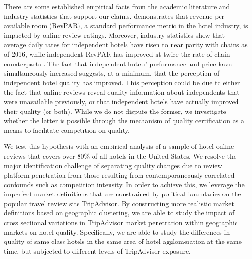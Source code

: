 \documentclass[mksc,blindrev]{informs3} %
\begin{document}
There are some established empirical facts from the academic literature and industry statistics that support our claims.  demonstrates that revenue per available room (RevPAR), a standard performance metric in the hotel industry, is impacted by online review ratings. Moreover, industry statistics show that average daily rates for independent hotels have risen to near parity with chains as of 2016, while independent RevPAR has improved at twice the rate of chain counterparts \citep{lodging2017}. The fact that independent hotels' performance and price have simultaneously increased suggests, at a minimum, that the perception of independent hotel quality has improved. This perception could be due to either the fact that online reviews reveal quality information about independents that were unavailable previously, or that independent hotels have actually improved their quality (or both). While we do not dispute the former, we investigate whether the latter is possible through the mechanism of quality certification as a means to facilitate competition on quality.

We test this hypothesis with an empirical analysis of a sample of hotel online reviews that covers over 80\% of all hotels in the United States. We resolve the major identification challenge of separating quality changes due to review platform penetration from those resulting from contemporaneously correlated confounds such as competition intensity. In order to achieve this, we leverage the imperfect market definitions that are constrained by political boundaries on the popular travel review site TripAdvisor. By constructing more realistic market definitions based on geographic clustering, we are able to study the impact of cross sectional variations in TripAdvisor market penetration within geographic markets on hotel quality. Specifically, we are able to study the differences in quality of same class hotels in the same area of hotel agglomeration at the same time, but subjected to different levels of TripAdvisor exposure. 
\end{document}
